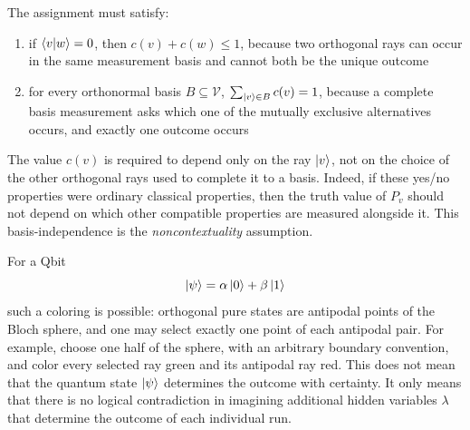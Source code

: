 The assignment must satisfy:
\begin{enumerate}[label=(\roman*)]
\item \label{item:kochen-specker-orthogonal}
if \(\braket{v|w}=0\), then
\(
c(v)+c(w)\leq 1
\),
because two orthogonal rays can occur in the same measurement basis and cannot both be the unique outcome
\item \label{item:kochen-specker-basis}
for every orthonormal basis \(B\subseteq\mathcal V\),
\(
\sum_{\ket v\in B}c(v)=1
\),
because a complete basis measurement asks which one of the mutually exclusive alternatives occurs, and exactly one outcome occurs
\end{enumerate}
The value \(c(v)\) is required to depend only on the ray \(\ket v\), not on the choice of the other orthogonal rays used to complete it to a basis.
Indeed, if these yes/no properties were ordinary classical properties, then the truth value of \(P_v\) should not depend on which other compatible properties are measured alongside it.
This basis-independence is the \emph{noncontextuality} assumption.
 


For a Qbit 
\[
\ket\psi=\alpha\ket0+\beta\ket1
\]
such a coloring is possible: orthogonal pure states are antipodal points of the Bloch sphere, and one may select exactly one point of each antipodal pair.
For example, choose one half of the sphere, with an arbitrary boundary convention, and color every selected ray green and its antipodal ray red.
This does not mean that the quantum state \(\ket\psi\) determines the outcome with certainty.
It only means that there is no logical contradiction in imagining additional hidden variables \(\lambda\) that determine the outcome of each individual run.


